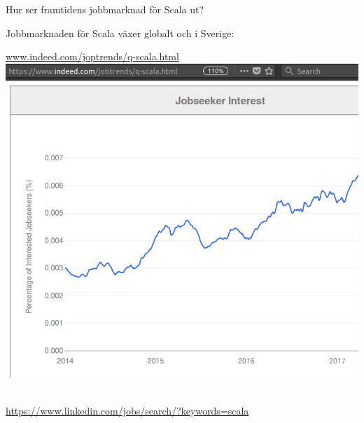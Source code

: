 \begin{Slide}{Hur ser framtidens jobbmarknad för Scala ut?}\SlideFontTiny

\hspace{-2.5em}\begin{minipage}{1.0\textwidth}
Jobbmarknaden för Scala växer globalt och i Sverige:

\begin{minipage}{0.48\textwidth}
\href{www.indeed.com/joptrends/q-scala.html}{www.indeed.com/joptrends/q-scala.html}\\
\vspace{1em}
\includegraphics[width=1.0\textwidth]{../img/w14/scala-jobs-indeed-2017.png}~~
\end{minipage}
\hfill\begin{minipage}{0.48\textwidth}
\vspace{1.25em}
\href{https://www.linkedin.com/jobs/search/?keywords=scala&location=Sweden&locationId=se%3A0}{https://www.linkedin.com/jobs/search/?keywords=scala}\\

\end{minipage}
\end{minipage}
\end{Slide}
